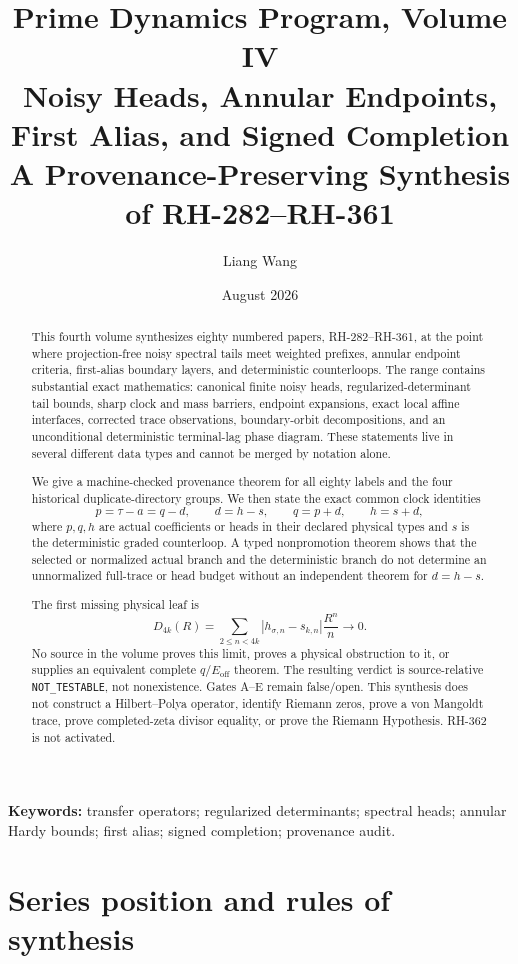 \documentclass[11pt]{article}
\title{\textbf{Prime Dynamics Program, Volume IV}\\
\Large Noisy Heads, Annular Endpoints, First Alias, and Signed Completion\\
\large A Provenance-Preserving Synthesis of RH-282--RH-361}
\author{Liang Wang}
\date{August 2026}
\theoremstyle{definition}
\theoremstyle{remark}
\newcommand{\Eoff}{E_{\mathrm{off}}}
\begin{document}
\maketitle

\begin{abstract}
This fourth volume synthesizes eighty numbered papers, RH-282--RH-361, at the
point where projection-free noisy spectral tails meet weighted prefixes,
annular endpoint criteria, first-alias boundary layers, and deterministic
counterloops.  The range contains substantial exact mathematics: canonical
finite noisy heads, regularized-determinant tail bounds, sharp clock and mass
barriers, endpoint expansions, exact local affine interfaces, corrected
trace observations, boundary-orbit decompositions, and an unconditional
deterministic terminal-lag phase diagram.  These statements live in several
different data types and cannot be merged by notation alone.

We give a machine-checked provenance theorem for all eighty labels and the
four historical duplicate-directory groups.  We then state the exact common
clock identities
\[
 p=\tau-a=q-d,\qquad d=h-s,\qquad q=p+d,\qquad h=s+d,
\]
where $p,q,h$ are actual coefficients or heads in their declared physical
types and $s$ is the deterministic graded counterloop.  A typed nonpromotion
theorem shows that the selected or normalized actual branch and the
deterministic branch do not determine an unnormalized full-trace or head
budget without an independent theorem for $d=h-s$.

The first missing physical leaf is
\[
 D_{4k}(R)=\sum_{2\le n<4k}|h_{\sigma,n}-s_{k,n}|\frac{R^n}{n}\longrightarrow0.
\]
No source in the volume proves this limit, proves a physical obstruction to
it, or supplies an equivalent complete $q/\Eoff$ theorem.  The resulting
verdict is source-relative \texttt{NOT\_TESTABLE}, not nonexistence.  Gates
A--E remain false/open.  This synthesis does not construct a Hilbert--Polya
operator, identify Riemann zeros, prove a von Mangoldt trace, prove
completed-zeta divisor equality, or prove the Riemann Hypothesis.  RH-362 is
not activated.
\end{abstract}

\noindent\textbf{Keywords:} transfer operators; regularized determinants;
spectral heads; annular Hardy bounds; first alias; signed completion;
provenance audit.

\section{Series position and rules of synthesis}
\end{document}
